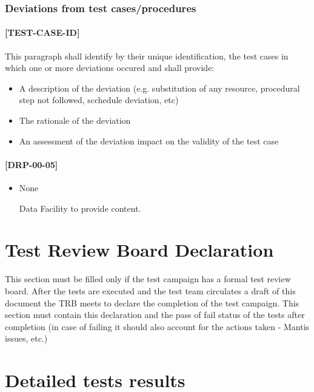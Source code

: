 \documentclass[DM,lsstdraft,STR,toc]{lsstdoc}
\begin{document}
\subsubsection{Deviations from test cases/procedures}
\paragraph{[TEST-CASE-ID]}
This paragraph shall identify by their unique identification, the test cases in which one or more deviations occured and shall provide:
\begin{itemize}
\item A description of the deviation (e.g. substitution of any resource, procedural step not followed, scchedule deviation, etc)
\item The rationale of the deviation
\item An assessment of the deviation impact on the validity of the test case
\end{itemize}

\paragraph{[DRP-00-05]}
\begin{itemize}
  \item None
\begin{note}
Data Facility to provide content.
\end{note}
\end{itemize}

\newpage

\section{Test Review Board Declaration\label{sect:trb}}
This section must be filled only if the test campaign has a  formal
test review board.
After the tests are executed and the test team circulates a draft of
this document the TRB meets to declare the completion of the test campaign.
This section must contain this declaration and the pass of fail status
of the tests after completion (in case of failing it should also account
for the actions taken - Mantis issues, etc.)

\newpage

\appendix

\newpage
\section{Detailed tests results \label{sect:results}}
\end{document}
